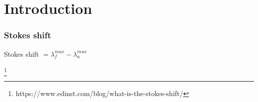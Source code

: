 
\section{Introduction} %




\begin{frame}
	\frametitle{Stokes shift}
    \begin{minipage}{0.4\textwidth} %
    \end{minipage}%
    \begin{minipage}{0.6\textwidth} %
Stokes shift $= \lambda_{f}^{max}-\lambda_{a}^{max}$
    \end{minipage}
\footnote{https://www.edinst.com/blog/what-is-the-stokes-shift/}
\end{frame}
\begin{frame}
    
\end{frame}


